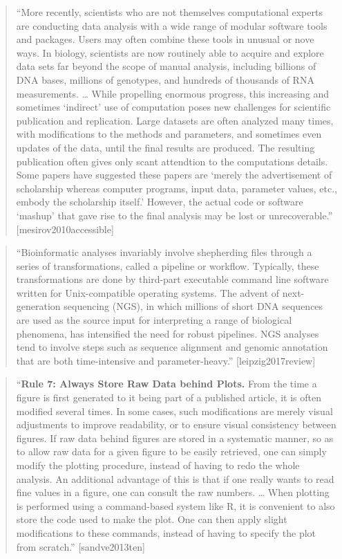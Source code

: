 \documentclass[]{tufte-book}
\begin{document}
\begin{quote}
``More recently, scientists who are not themselves computational experts are
conducting data analysis with a wide range of modular software tools and packages.
Users may often combine these tools in unusual or nove ways. In biology,
scientists are now routinely able to acquire and explore data sets far beyond
the scope of manual analysis, including billions of DNA bases, millions of genotypes,
and hundreds of thousands of RNA measurements. \ldots{} While propelling enormous
progress, this increasing and sometimes `indirect' use of computation poses
new challenges for scientific publication and replication. Large datasets are
often analyzed many times, with modifications to the methods and parameters, and
sometimes even updates of the data, until the final results are produced. The
resulting publication often gives only scant attendtion to the computations details.
Some papers have suggested these papers are `merely the advertisement of
scholarship whereas computer programs, input data, parameter values, etc., embody
the scholarship itself.' However, the actual code or software `mashup' that
gave rise to the final analysis may be lost or unrecoverable.'' {[}mesirov2010accessible{]}
\end{quote}

\begin{quote}
``Bioinformatic analyses invariably involve shepherding files through a series
of transformations, called a pipeline or workflow. Typically, these transformations
are done by third-part executable command line software written for Unix-compatible
operating systems. The advent of next-generation sequencing (NGS), in which millions
of short DNA sequences are used as the source input for interpreting a range of
biological phenomena, has intensified the need for robust pipelines. NGS analyses
tend to involve steps such as sequence alignment and genomic annotation that are
both time-intensive and parameter-heavy.'' {[}leipzig2017review{]}
\end{quote}

\begin{quote}
``\textbf{Rule 7: Always Store Raw Data behind Plots.} From the time a figure is first
generated to it being part of a published article, it is often modified several
times. In some cases, such modifications are merely visual adjustments to
improve readability, or to ensure visual consistency between figures. If raw data
behind figures are stored in a systematic manner, so as to allow raw data for
a given figure to be easily retrieved, one can simply modify the plotting
procedure, instead of having to redo the whole analysis. An additional
advantage of this is that if one really wants to read fine values in a figure,
one can consult the raw numbers. \ldots{} When plotting is performed using a
command-based system like R, it is convenient to also store the code
used to make the plot. One can then apply slight modifications to these
commands, instead of having to specify the plot from scratch.'' {[}sandve2013ten{]}
\end{quote}
\end{document}
